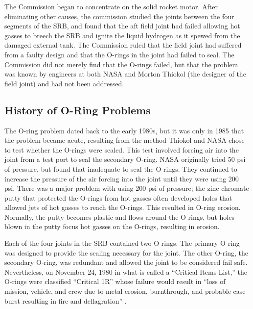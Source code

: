 The Commission began to concentrate on the solid rocket motor. After eliminating other causes, the commission studied the joints between the four segments of the SRB, and found that the aft field joint had failed allowing hot gasses to breech the SRB and ignite the liquid hydrogen as it spewed from the damaged external tank. The Commission ruled that the field joint had suffered from a faulty design and that the O-rings in the joint had failed to seal. The Commission did not merely find that the O-rings failed, but that the problem was known by engineers at both NASA and Morton Thiokol (the designer of the field joint) and had not been addressed.

\subsection{History of O-Ring Problems}

The O-ring problem dated back to the early 1980s, but it was only in 1985 that the problem became acute, resulting from the method Thiokol and NASA chose to test whether the O-rings were sealed. This test involved forcing air into the joint from a test port to seal the secondary O-ring. NASA originally tried 50 psi of pressure, but found that inadequate to seal the O-rings. They continued to increase the pressure of the air forcing into the joint until they were using 200 psi. There was a major problem with using 200 psi of pressure; the zinc chromate putty that protected the O-rings from hot gasses often developed holes that allowed jets of hot gasses to reach the O-rings. This resulted in O-ring erosion. Normally, the putty becomes plastic and flows around the O-rings, but holes blown in the putty focus hot gasses on the O-rings, resulting in erosion.

Each of the four joints in the SRB contained two O-rings. The primary O-ring was designed to provide the sealing necessary for the joint. The other O-ring, the secondary O-ring, was redundant and allowed the joint to be considered fail safe. Nevertheless, on November 24, 1980 in what is called a ``Critical Items List,'' the O-rings were classified ``Critical 1R'' whose failure would result in ``loss of mission, vehicle, and crew due to metal erosion, burnthrough, and probable case burst resulting in fire and deflagration'' \cite[vol. 1, p. 239]{rogers}.

